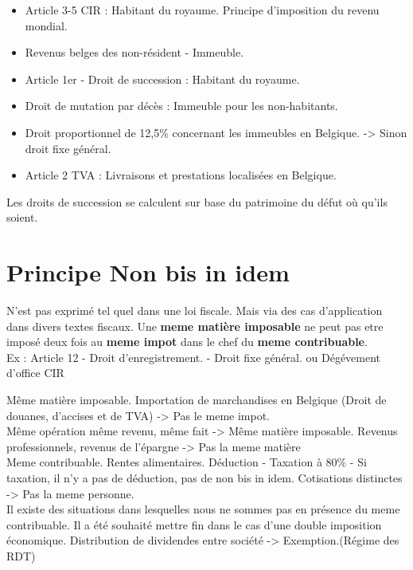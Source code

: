 \documentclass{book}
\begin{document}
\begin{itemize}
\item Article 3-5 CIR : Habitant du royaume. Principe d'imposition du revenu mondial.
\item Revenus belges des non-résident - Immeuble.
\item Article 1er - Droit de succession : Habitant du royaume.
\item Droit de mutation par décès : Immeuble pour les non-habitants.
\item Droit proportionnel de 12,5\% concernant les immeubles en Belgique. -> Sinon droit fixe général.
\item Article 2 TVA : Livraisons et prestations localisées en Belgique.
\end{itemize}

Les droits de succession se calculent sur base du patrimoine du défut où qu'ils soient.	

\section{Principe Non bis in idem}

N'est pas exprimé tel quel dans une loi fiscale. Mais via des cas d'application dans divers textes fiscaux. Une \textbf{meme matière imposable} ne peut pas etre imposé deux fois au \textbf{meme impot} dans le chef du \textbf{meme contribuable}.\\

Ex : Article 12 - Droit d'enregistrement. - Droit fixe général.  ou Dégévement d'office CIR

Même matière imposable. Importation de marchandises en Belgique (Droit de douanes, d'accises et de TVA) -> Pas le meme impot.\\

Même opération même revenu, même fait -> Même matière imposable. Revenus professionnels, revenus de l'épargne -> Pas la meme matière\\

Meme contribuable. Rentes alimentaires. Déduction - Taxation à 80\% - Si taxation, il n'y a pas de déduction, pas de non bis in idem. Cotisations distinctes -> Pas la meme personne.\\

Il existe des situations dans lesquelles nous ne sommes pas en présence du meme contribuable. Il a été souhaité mettre fin dans le cas d'une double imposition économique. Distribution de dividendes entre société -> Exemption.(Régime des RDT)\\
\end{document}
